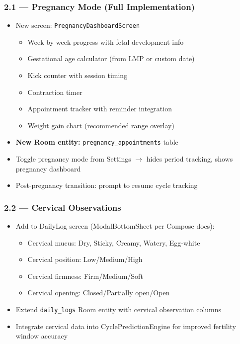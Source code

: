 \documentclass[12pt,a4paper]{article}
\begin{document}
\subsubsection{2.1 — Pregnancy Mode (Full Implementation)}
\begin{itemize}[leftmargin=1.5em]
  \item New screen: \texttt{PregnancyDashboardScreen}
  \begin{itemize}
    \item Week-by-week progress with fetal development info
    \item Gestational age calculator (from LMP or custom date)
    \item Kick counter with session timing
    \item Contraction timer
    \item Appointment tracker with reminder integration
    \item Weight gain chart (recommended range overlay)
  \end{itemize}
  \item \textbf{New Room entity:} \texttt{pregnancy\_appointments} table
  \item Toggle pregnancy mode from Settings $\rightarrow$ hides period tracking, shows pregnancy dashboard
  \item Post-pregnancy transition: prompt to resume cycle tracking
\end{itemize}

\subsubsection{2.2 — Cervical Observations}
\begin{itemize}[leftmargin=1.5em]
  \item Add to DailyLog screen (ModalBottomSheet per Compose docs):
  \begin{itemize}
    \item Cervical mucus: Dry, Sticky, Creamy, Watery, Egg-white
    \item Cervical position: Low/Medium/High
    \item Cervical firmness: Firm/Medium/Soft
    \item Cervical opening: Closed/Partially open/Open
  \end{itemize}
  \item Extend \texttt{daily\_logs} Room entity with cervical observation columns
  \item Integrate cervical data into CyclePredictionEngine for improved fertility window accuracy
\end{itemize}
\end{document}
